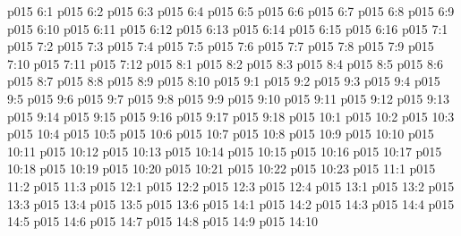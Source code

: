 \vs p015 6:1 
\vs p015 6:2 
\vs p015 6:3 
\vs p015 6:4 
\vs p015 6:5 
\vs p015 6:6 
\vs p015 6:7 \pc 
\vs p015 6:8 \pc 
\vs p015 6:9 
\vs p015 6:10 
\vs p015 6:11 \pc 
\vs p015 6:12 \pc 
\vs p015 6:13 
\vs p015 6:14 \pc 
\vs p015 6:15 
\vs p015 6:16 
\vs p015 7:1 
\vs p015 7:2 \pc 
\vs p015 7:3 \pc 
\vs p015 7:4 
\vs p015 7:5 \pc 
\vs p015 7:6 \pc 
\vs p015 7:7 \pc 
\vs p015 7:8 \pc 
\vs p015 7:9 \pc 
\vs p015 7:10 \pc 
\vs p015 7:11 
\vs p015 7:12 \pc 
{}
\vs p015 8:1 
\vs p015 8:2 
\vs p015 8:3 \pc 
\vs p015 8:4 
\vs p015 8:5 
\vs p015 8:6 
\vs p015 8:7 
\vs p015 8:8 
\vs p015 8:9 
\vs p015 8:10 
\vs p015 9:1 
\vs p015 9:2 
\vs p015 9:3 \pc 
\vs p015 9:4 
\vs p015 9:5 
\vs p015 9:6 
\vs p015 9:7 
\vs p015 9:8 
\vs p015 9:9 
\vs p015 9:10 
\vs p015 9:11 \pc 
\vs p015 9:12 
\vs p015 9:13 
\vs p015 9:14 
\vs p015 9:15 \pc 
\vs p015 9:16 
\vs p015 9:17 
\vs p015 9:18 \pc 
{}
\vs p015 10:1 
\vs p015 10:2 
\vs p015 10:3 \pc 
\vs p015 10:4 
\vs p015 10:5 
\vs p015 10:6 
\vs p015 10:7 
\vs p015 10:8 
\vs p015 10:9 
\vs p015 10:10 
\vs p015 10:11 \pc 
\vs p015 10:12 
\vs p015 10:13 
\vs p015 10:14 
\vs p015 10:15 
\vs p015 10:16 
\vs p015 10:17 
\vs p015 10:18 
\vs p015 10:19 
\vs p015 10:20 
\vs p015 10:21 \pc 
\vs p015 10:22 \pc 
\vs p015 10:23 
\vs p015 11:1 
\vs p015 11:2 
\vs p015 11:3 
\vs p015 12:1 
\vs p015 12:2 
\vs p015 12:3 
\vs p015 12:4 
\vs p015 13:1 
\vs p015 13:2 
\vs p015 13:3 
\vs p015 13:4 \pc 
\vs p015 13:5 
\vs p015 13:6 
\vs p015 14:1 
\vs p015 14:2 
\vs p015 14:3 
\vs p015 14:4 
\vs p015 14:5 \pc 
\vs p015 14:6 
\vs p015 14:7 
\vs p015 14:8 
\vs p015 14:9 \pc 
\vsetoff
\vs p015 14:10 
\quizlink

